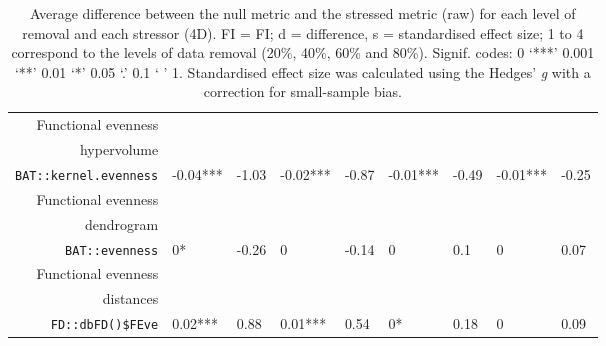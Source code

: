 \begin{table}[ht]
\begin{tabular}{rllllllll}
  Functional evenness\\ hypervolume\\ \texttt{BAT::kernel.evenness} & -0.04*** & -1.03 & -0.02*** & -0.87 & -0.01*** & -0.49 & -0.01*** & -0.25 \\ 
  Functional evenness\\ dendrogram\\ \texttt{BAT::evenness} & 0* & -0.26 & 0 & -0.14 & 0 & 0.1 & 0 & 0.07 \\ 
  Functional evenness\\ distances\\ \texttt{FD::dbFD()\$FEve} & 0.02*** & 0.88 & 0.01*** & 0.54 & 0* & 0.18 & 0 & 0.09 \\ 
   \hline
\end{tabular}
\caption{Average difference between the null metric and the stressed metric (raw) for each level of removal and each stressor (4D). FI = FI; d = difference, s = standardised effect size; 1 to 4 correspond to the levels of data removal (20\%, 40\%, 60\% and 80\%). Signif. codes:  0 ‘***’ 0.001 ‘**’ 0.01 ‘*’ 0.05 ‘.’ 0.1 ‘ ’ 1. Standardised effect size was calculated using the Hedges' \textit{g} with a correction for small-sample bias.} 
\end{table}
